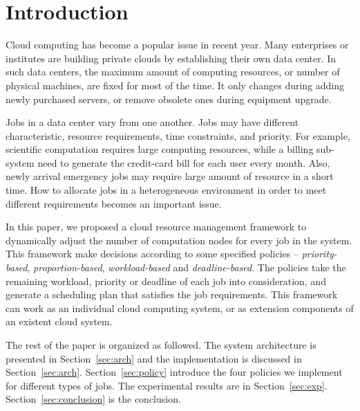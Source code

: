 \section{Introduction}\label{sec:intro}

Cloud computing has become a popular issue in recent year.
Many enterprises or institutes are building private clouds by 
establishing their own data center.
In such data centers, the maximum amount of computing resources, or 
number of physical machines, are fixed for most of the time.
It only changes during adding newly purchased servers, or remove 
obsolete ones during equipment upgrade.


Jobs in a data center vary from one another.
Jobs may have different characteristic, resource requirements, time 
constraints, and priority.
For example, scientific computation requires large computing resources,
while a billing sub-system need to generate the credit-card bill for 
each user every month.
Also, newly arrival emergency jobs may require large amount of resource
in a short time.
How to allocate jobs in a heterogeneous environment in order to meet 
different requirements becomes an important issue.

In this paper, we proposed a cloud resource management framework to 
dynamically adjust the number of computation nodes for every job in the
system.
This framework make decisions according to some specified policies --
\emph{priority-based}, \emph{proportion-based}, \emph{workload-based}
and \emph{deadline-based}.
The policies take the remaining workload, priority or deadline of each
job into consideration, and generate a scheduling plan that satisfies 
the job requirements.
This framework can work as an individual cloud computing system, or as
extension components of an existent cloud system.

The rest of the paper is organized as followed.
The system architecture is presented in Section~\ref{sec:arch} and the
implementation is discussed in Section~\ref{sec:arch}.
Section~\ref{sec:policy} introduce the four policies we implement for 
different types of jobs.
The experimental results are in Section~\ref{sec:exp}.
Section~\ref{sec:conclusion} is the conclusion.
